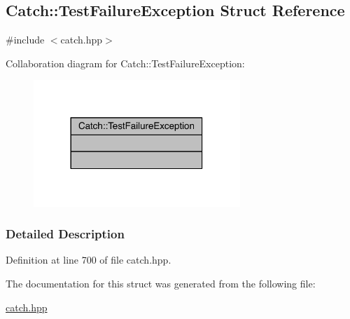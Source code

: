 \hypertarget{a00087}{}\subsection{Catch\+:\+:Test\+Failure\+Exception Struct Reference}
\label{a00087}


{\ttfamily \#include $<$catch.\+hpp$>$}



Collaboration diagram for Catch\+:\+:Test\+Failure\+Exception\+:\nopagebreak
\begin{figure}[H]
\begin{center}
\leavevmode
\includegraphics[width=221pt]{a00288}
\end{center}
\end{figure}


\subsubsection{Detailed Description}


Definition at line 700 of file catch.\+hpp.



The documentation for this struct was generated from the following file\+:\begin{DoxyCompactItemize}
\item 
\hyperlink{a00094}{catch.\+hpp}\end{DoxyCompactItemize}
